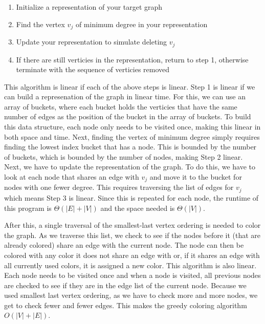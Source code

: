 \documentclass{article}
\begin{document}
        \begin{enumerate}
            \item Initialize a representation of your target graph
            \item Find the vertex $v_j$ of minimum degree in your representation
            \item Update your representation to simulate deleting $v_j$
            \item If there are still verticies in the representation, return to step 1, otherwise terminate with the sequence of verticies removed
        \end{enumerate}

        This algorithm is linear if each of the above steps is linear. Step 1 is linear if we can build a represenation of the graph in linear time. For this, we can use an array of buckets, where each bucket holds the verticies that have the same number of edges as the position of the bucket in the array of buckets. To build this data structure, each node only needs to be visited once, making this linear in both space and time. Next, finding the vertex of minimum degree simply requires finding the lowest index bucket that has a node. This is bounded by the number of buckets, which is bounded by the number of nodes, making Step 2 linear. Next, we have to update the representation of the graph. To do this, we have to look at each node that shares an edge with $v_j$ and move it to the bucket for nodes with one fewer degree. This requires traversing the list of edges for $v_j$ which means Step 3 is linear. Since this is repeated for each node, the runtime of this program is $\Theta\left(|E| + |V|\right)$ and the space needed is $\Theta(|V|)$.
        \par
        After this, a single traversal of the smallest-last vertex ordering is needed to color the graph. As we traverse this list, we check to see if the nodes before it (that are already colored) share an edge with the current node. The node can then be colored with any color it does not share an edge with or, if it shares an edge with all currently used colors, it is assigned a new color. This algorithm is also linear. Each node needs to be visited once and when a node is visited, all previous nodes are checked to see if they are in the edge list of the current node. Because we used smallest last vertex ordering, as we have to check more and more nodes, we get to check fewer and fewer edges. This makes the greedy coloring algorithm $O(|V| + |E|)$.
\end{document}
